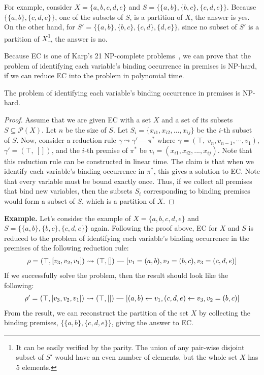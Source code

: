 \noindent
For example, consider $X = \{a, b, c, d, e\}$ and $S = \{\{a,b\}, \{b,c\}, \{c,d,e\}\}$.
Because $\{\{a,b\}, \{c,d,e\}\}$, one of the subsets of $S$, is a partition of $X$,
the answer is yes.
On the other hand, for $S' = \{\{a,b\}, \{b,c\}, \{c,d\}, \{d,e\}\}$,
since no subset of $S'$ is a partition of $X$\footnote{It can be easily
verified by the parity. The union of any pair-wise disjoint subset of $S'$ would have an even number
of elements, but the whole set $X$ has 5 elements.}, the answer is no.

Because EC is one of Karp's 21 NP-complete problems~\cite{karp72},
we can prove that the problem of identifying each variable's binding occurrence in premises is NP-hard,
if we can reduce EC into the problem in polynomial time.

\begin{theorem}\label{thm:np-hard}
The problem of identifying each variable's binding occurrence in premises is NP-hard.
\end{theorem}
\begin{proof}
Assume that we are given EC with a set $X$ and
a set of its subsets $S \subseteq \mathcal{P}(X)$. Let $n$ be the size of $S$.
Let $S_i = \{x_{i1}, x_{i2}, ..., x_{ij}\}$ be the $i$-th subset of $S$.
Now, consider a reduction rule $\gamma \leadsto \gamma'\ \mbox{---}\ \pi^*$
where $\gamma = (\top,\ v_n, v_{n-1}, \cdots, v_1)$,
$\gamma' = (\top,\ [])$, and
the $i$-th premise of $\pi^*$ be $v_i = (x_{i1}, x_{i2}, ..., x_{ij})$.
Note that this reduction rule can be constructed in linear time.
The claim is that when we identify each variable's binding occurrence in $\pi^*$,
this gives a solution to EC.
Note that every variable must be bound exactly once.
Thus, if we collect all premises that bind new variables,
then the subsets $S_i$ corresponding to binding premises
would form a subset of $S$, which is a partition of $X$.
\end{proof}

\textbf{Example.}
Let's consider the example of $X = \{a, b, c, d, e\}$ and $S = \{\{a,b\}, \{b,c\}, \{c,d,e\}\}$ again.
Following the proof above, EC for $X$ and $S$ is reduced to the problem of
identifying each variable's binding occurrence in the premises of the
following reduction rule:
\[
\begin{array}{l@{~}l@{~}c@{~}l}
\rho = & (\top, [v_3, v_2, v_1]) &\leadsto& (\top, [])\ \mbox{---}\
[v_1 = (a,b), v_2 = (b,c), v_3 = (c, d, e)]
\end{array}
 \]
If we successfully solve the problem, then the result should look like the following:
\[
\begin{array}{l@{~}l@{~}c@{~}l}
\rho' = & (\top, [v_3, v_2, v_1]) &\leadsto& (\top, [])\ \mbox{---}\
[(a,b) \leftarrow v_1, (c, d, e) \leftarrow v_3, v_2 = (b,c)]
\end{array}
\]
From the result, we can reconstruct the partition of the set $X$
by collecting the binding premises, $\{\{a, b\}, \{c, d, e\}\}$, giving the answer to EC.


